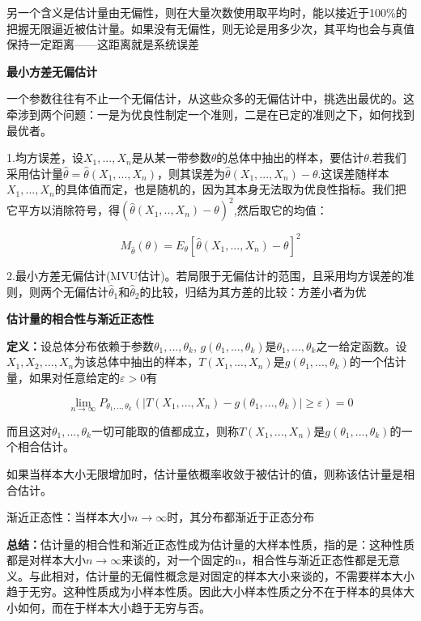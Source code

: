 \documentclass{ctexart}
\begin{document}
	另一个含义是估计量由无偏性，则在大量次数使用取平均时，能以接近于100\%的把握无限逼近被估计量。如果没有无偏性，则无论是用多少次，其平均也会与真值保持一定距离——这距离就是系统误差
	
	\mbox{}
	
	\textbf{最小方差无偏估计}
	
	一个参数往往有不止一个无偏估计，从这些众多的无偏估计中，挑选出最优的。这牵涉到两个问题：一是为优良性制定一个准则，二是在已定的准则之下，如何找到最优者。
	
	1.均方误差，设\(X_1,...,X_n\)是从某一带参数\(\theta\)的总体中抽出的样本，要估计\(\theta\).若我们采用估计量\(\hat{\theta}=\hat{\theta}(X_1,...,X_n)\)，则其误差为\(\hat{\theta}(X_1,...,X_n)-\theta\).这误差随样本\(X_1,...,X_n\)的具体值而定，也是随机的，因为其本身无法取为优良性指标。我们把它平方以消除符号，得\((\hat{\theta}(X_1,..,X_n)-\theta)^2\),然后取它的均值：
	
	\[M_{\hat{\theta}}(\theta)=E_{\theta}[\hat{\theta}(X_1,...,X_n)-\theta]^2\]
	
	2.最小方差无偏估计(MVU估计)。若局限于无偏估计的范围，且采用均方误差的准则，则两个无偏估计\(\hat{\theta}_1\)和\(\hat{\theta}_2\)的比较，归结为其方差的比较：方差小者为优
	
	\mbox{}
	
	\textbf{估计量的相合性与渐近正态性}
	
	\textbf{定义：}设总体分布依赖于参数\(\theta_1,...,\theta_k\), \(g(\theta_1,...,\theta_k)\)是\(\theta_1,...,\theta_k\)之一给定函数。设\(X_1,X_2,...,X_n\)为该总体中抽出的样本，\(T(X_1,...,X_n)\)是\(g(\theta_1,...,\theta_k)\)的一个估计量，如果对任意给定的\(\varepsilon > 0\)有
	
	\[\lim\limits_{n \to \infty}P_{\theta_1,..,\theta_k}(|T(X_1,...,X_n)-g(\theta_1,...,\theta_k)| \geq \varepsilon) = 0\]
	
	而且这对\(\theta_1,...,\theta_k\)一切可能取的值都成立，则称\(T(X_1,...,X_n)\)是\(g(\theta_1,...,\theta_k)\)的一个相合估计。
	
	如果当样本大小无限增加时，估计量依概率收敛于被估计的值，则称该估计量是相合估计。
	
	渐近正态性：当样本大小\(n \to \infty\)时，其分布都渐近于正态分布
	
	\textbf{总结：}估计量的相合性和渐近正态性成为估计量的大样本性质，指的是：这种性质都是对样本大小\(n \to \infty\)来谈的，对一个固定的n，相合性与渐近正态性都是无意义。与此相对，估计量的无偏性概念是对固定的样本大小来谈的，不需要样本大小趋于无穷。这种性质成为小样本性质。因此大小样本性质之分不在于样本的具体大小如何，而在于样本大小趋于无穷与否。
	
\end{document}
